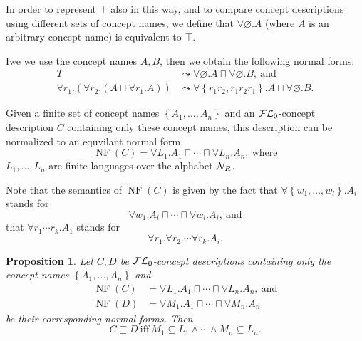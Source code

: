 \documentclass[openany]{scrbook}
\theoremstyle{break}
\newtheorem{Proposition}[Theorem]{Proposition}
\theoremstyle{nonumberbreak}
\theoremstyle{nonumberplain}
\theoremstyle{nonumberbreak}
\newcommand{\set}[1]{\left\{#1\right\}}
\newcommand{\FLz}{{\cal F}{\cal L}_0}
\newcommand{\NF}[1]{\operatorname{NF}\left(#1\right)}
\begin{document}
In order to represent $\top$ also in this way, and to compare concept
descriptions using different sets of concept names, we define that
$\forall \varnothing.A$ (where $A$ is an arbitrary concept name) is
equivalent to $\top$.

Iwe we use the concept names $A, B$, then we obtain the following
normal forms:
\begin{align*}
  T & \leadsto \forall \varnothing.A \sqcap \forall  \varnothing.B,\
  \text{and} \\
  \forall r_1.\left(\forall r_2.\left(A \sqcap \forall
      r_1.A\right)\right) & \leadsto \forall \set{r_1r_2, r_1r_2r_1}.A
  \sqcap \forall \varnothing.B.
\end{align*}

Given a finite set of concept names $\set{A_1, \dotsc, A_n}$ and an
$\FLz$-concept description $C$ containing only these concept names,
this description can be normalized to an equvilant normal form
\begin{equation*}
  \NF{C} = \forall L_1.A_1 \sqcap \dotsb \sqcap \forall L_n.A_n,\ \text{where}
\end{equation*}
$L_1, \dotsc, L_n$ are finite languages over the alphabet ${\cal
  N}_R$.

Note that the semantics of $\NF{C}$ is given by the fact that $\forall
\set{w_1, \dotsc, w_l}.A_i$ stands for
\begin{equation*}
  \forall w_1.A_i \sqcap \dotsb \sqcap \forall w_l.A_i,\ \text{and}
\end{equation*}
that $\forall r_1 \dotsm r_k.A_1$ stands for
\begin{equation*}
  \forall r_1.\forall r_2. \dotsm \forall r_k. A_i.
\end{equation*}

\begin{Proposition}
  \label{5.11}
  Let $C, D$ be $\FLz$-concept descriptions containing only the
  concept names $\set{A_1, \dotsc, A_n}$ and
  \begin{align*}
    \NF{C} & = \forall L_1.A_1 \sqcap \dotsb \sqcap \forall L_n.A_n,\
    \text{and} \\
    \NF{D} & = \forall M_1.A_1 \sqcap \dotsb \sqcap \forall M_n.A_n
  \end{align*}
  be their corresponding normal forms. Then
  \begin{equation*}
    C \sqsubseteq D\ \text{iff}\ M_1 \subseteq L_1 \wedge \dotsb
    \wedge M_n \subseteq L_n.
  \end{equation*}
\end{Proposition}
\end{document}
